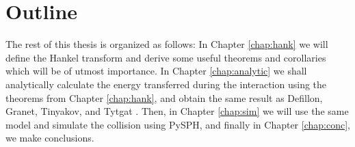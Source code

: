 \section{Outline}

The rest of this thesis is organized as follows: In Chapter \ref{chap:hank} we will define the Hankel transform and derive some useful theorems and corollaries which will be of utmost importance. In Chapter \ref{chap:analytic} we shall analytically calculate the energy transferred during the interaction using the theorems from Chapter \ref{chap:hank}, and obtain the same result as Defillon, Granet, Tinyakov, and Tytgat \cite{tidalcapture}. Then, in Chapter \ref{chap:sim} we will use the same model and simulate the collision using PySPH, and finally in Chapter \ref{chap:conc}, we make conclusions.


%
